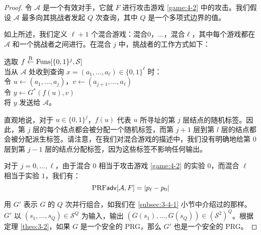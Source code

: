 \begin{proof}
令 $\mathcal{A}$ 是一个有效对手，它就 $F$ 进行攻击游戏 \ref{game:4-2} 中的攻击。我们假设 $\mathcal{A}$ 最多向其挑战者发起 $Q$ 次查询，其中 $Q$ 是一个多项式边界的值。

如上所述，我们定义 $\ell+1$ 个混合游戏：混合$0$，$\dots$，混合$\ell$，其中每个游戏都在 $\mathcal{A}$ 和一个挑战者之间进行。在混合 $j$ 中，挑战者的工作方式如下：

\vspace{5pt}

\hspace*{5pt} 选取 $f\overset{\rm R}\leftarrow{\rm Funs}[\{0,1\}^j,\mathcal{S}]$\\
\hspace*{26pt} 当从 $\mathcal{A}$ 处收到查询 $x=(a_1,\dots,a_\ell)\in\{0,1\}^\ell$ 时：\\
\hspace*{50pt} 令 $u\leftarrow(a_1,\dots,a_j)$，$v\leftarrow(a_{j+1},\dots,a_\ell)$\\
\hspace*{50pt} 令 $y\leftarrow G^*(f(u),v)$\\
\hspace*{50pt} 将 $y$ 发送给 $\mathcal{A}$。

\vspace{5pt}

\noindent
直观地说，对于 $u\in\{0,1\}^j$，$f(u)$ 代表 $u$ 所寻址的第 $j$ 层结点的随机标签。因此，第 $j$ 层的每个结点都会被分配一个随机标签，而第 $j+1$ 层到第 $l$ 层的结点都会被分配派生标签。请注意，在我们对混合游戏的描述中，我们没有明确地给第 $0$ 层到第 $j-1$ 层的结点分配标签，因为这些标签不影响任何输出。

对于 $j=0,\dots,\ell$，由于混合 $0$ 相当于攻击游戏 \ref{game:4-2} 的实验 $0$，而混合 $\ell$ 相当于实验 $1$，我们有：
\begin{equation}\label{eq:4-30}
{\rm PRF\mathsf{adv}}[\mathcal{A},F]=|p_\ell-p_0|
\end{equation}

用 $G'$ 表示 $G$ 的 $Q$ 次并行组合，如我们在 \ref{subsec:3-4-1} 小节中介绍过的那样。$G'$ 以 $(s_1,\dots,s_Q)\in\mathcal{S}^Q$ 为输入，输出 $(G(s_1),\dots,G(s_Q))\in(\mathcal{S}^2)^Q$。根据定理 \ref{theo:3-2}，如果 $G$ 是一个安全的 PRG，那么 $G'$ 也是一个安全的 PRG。


\end{proof}
